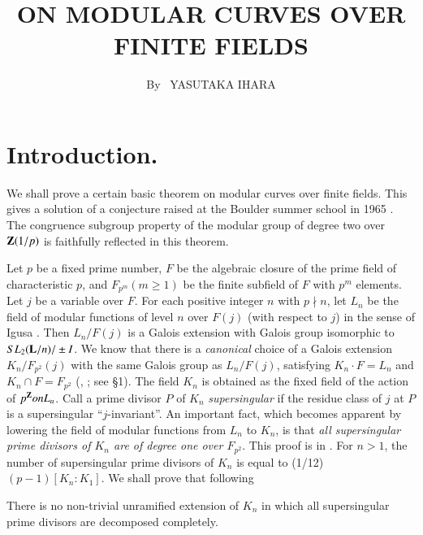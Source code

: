 
\title{ON MODULAR CURVES OVER FINITE FIELDS}

\author{By~ YASUTAKA IHARA}

\date{}
\maketitle


\setcounter{pageoriginal}{160}

\section*{Introduction.}\pageoriginale We shall prove a certain basic theorem on modular curves over finite fields. This gives a solution of a conjecture raised at the Boulder summer school in 1965 \cite{art6-key7}. The congruence subgroup property of the modular group of degree two over $\mathbf{Z}(1/p)$ is faithfully reflected in this theorem.

Let $p$ be a fixed prime number, $F$ be the algebraic closure of the prime field of characteristic $p$, and $F_{p^m} (m \geqslant 1)$ be the finite subfield of $F$ with $p^m$ elements. Let $j$ be a variable over $F$. For each positive integer $n$ with $p\nmid n$, let $L_n$ be the field of modular functions of level $n$ over $F(j)$ (with respect to $j$) in the sense of Igusa \cite{art6-key5}. Then $L_n / F (j)$ is a Galois extension with Galois group isomorphic to $SL_2 (\mathbf{L}/ n) / \pm I$. We know that there is a \textit{canonical} choice of a Galois extension $K_n / F_{p^2} (j)$ with the same Galois group as $L_n / F(j)$, satisfying $K_n \cdot F= L_n$ and $K_n \cap F = F_{p^2}$ (\cite{art6-key7}, \cite{art6-key8}; see \S 1). The field $K_n$ is obtained as the fixed field of the action of $p^{\mathbf{Z}} on L_n$. Call a prime divisor $P$ of $K_n$ \textit{supersingular} if the residue class of $j$ at $P$ is a supersingular ``$j$-invariant''. An important fact, which becomes apparent by lowering the field of modular functions from $L_n$ to $K_n$, is that \textit{all supersingular prime divisors of $K_n$ are of degree one over $F_{p^2}$}. This proof is in \cite{art6-key8}. For $n > 1$, the number of supersingular prime divisors of $K_n$ is equal to (1/12) $(p-1) [K_n: K_1]$. We shall prove that following 

\begin{theorem*}
There is no non-trivial unramified extension of $K_n$ in which all supersingular prime divisors are decomposed completely.
\end{theorem*}

